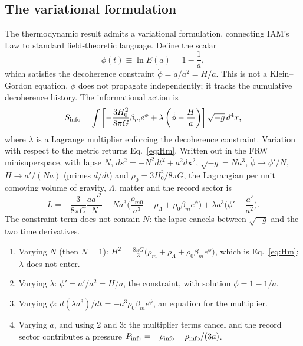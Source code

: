 \subsection{The variational formulation}\label{sec:law_variational}
The thermodynamic result admits a variational formulation, connecting IAM's Law to standard field-theoretic language. Define the scalar
\begin{equation}
\phi(t)\equiv\ln E(a)=1-\frac1a , \label{eq:law_phi}
\end{equation}
which satisfies the decoherence constraint $\dot\phi=\dot a/a^2=H/a$. This is not a Klein--Gordon equation. $\phi$ does not propagate independently; it
tracks the cumulative decoherence history. The informational action is
\begin{equation}
S_{\rm info}=\int\left[-\frac{3H_0^2}{8\pi G}\beta_me^{\phi}+\lambda\left(\dot\phi-\frac{H}{a}\right)\right]\sqrt{-g}\,d^4x, \label{eq:law_action}
\end{equation}
where $\lambda$ is a Lagrange multiplier enforcing the decoherence constraint. Variation with respect to the metric returns Eq.~\eqref{eq:Hm}. Written out
in the FRW minisuperspace, with lapse $N$, $ds^2=-N^2dt^2+a^2d\mathbf x^2$, $\sqrt{-g}=Na^3$, $\dot\phi\to\phi'/N$, $H\to a'/(Na)$ (primes $d/dt$) and
$\rho_0=3H_0^2/8\pi G$, the Lagrangian per unit comoving volume of gravity, $\Lambda$, matter and the record sector is
\begin{equation}
L=-\frac{3}{8\pi G}\frac{aa'^2}{N}-Na^3\Big(\frac{\rho_{m0}}{a^3}+\rho_\Lambda+\rho_0\beta_me^{\phi}\Big)+\lambda a^3\Big(\phi'-\frac{a'}{a^2}\Big).
\label{eq:law_L}
\end{equation}
The constraint term does not contain $N$: the lapse cancels between $\sqrt{-g}$ and the two time derivatives.
\begin{enumerate}
\item Varying $N$ (then $N=1$): $H^2=\tfrac{8\pi G}{3}\big(\rho_m+\rho_\Lambda+\rho_0\beta_me^{\phi}\big)$, which is Eq.~\eqref{eq:Hm}; $\lambda$ does not enter.
\item Varying $\lambda$: $\phi'=a'/a^2=H/a$, the constraint, with solution $\phi=1-1/a$.
\item Varying $\phi$: $d(\lambda a^3)/dt=-a^3\rho_0\beta_me^{\phi}$, an equation for the multiplier.
\item Varying $a$, and using 2 and 3: the multiplier terms cancel and the record sector contributes a pressure $P_{\rm info}=-\rho_{\rm info}-\rho_{\rm info}/(3a)$.
\end{enumerate}
